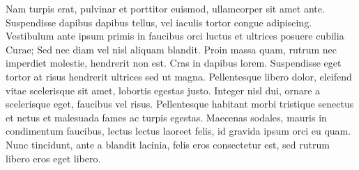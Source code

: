 Nam turpis erat, pulvinar et porttitor euismod, ullamcorper sit amet ante.
Suspendisse dapibus dapibus tellus, vel iaculis tortor congue adipiscing.
Vestibulum ante ipsum primis in faucibus orci luctus et ultrices posuere cubilia
Curae; Sed nec diam vel nisl aliquam blandit. Proin massa quam, rutrum nec
imperdiet molestie, hendrerit non est. Cras in dapibus lorem. Suspendisse eget
tortor at risus hendrerit ultrices sed ut magna. Pellentesque libero dolor,
eleifend vitae scelerisque sit amet, lobortis egestas justo. Integer nisl dui,
ornare a scelerisque eget, faucibus vel risus. Pellentesque habitant morbi
tristique senectus et netus et malesuada fames ac turpis egestas. Maecenas
sodales, mauris in condimentum faucibus, lectus lectus laoreet felis, id gravida
ipsum orci eu quam. Nunc tincidunt, ante a blandit lacinia, felis eros
consectetur est, sed rutrum libero eros eget libero.